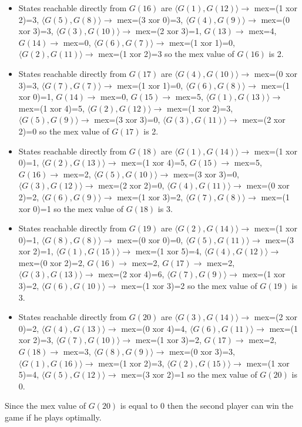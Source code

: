 \begin{solution}
\begin{itemize}
\item States reachable directly from $G(16)$ are $\langle G(1), G(12) \rangle \rightarrow$ mex=(1 xor 2)=3, $\langle G(5), G(8) \rangle \rightarrow$ mex=(3 xor 0)=3, $\langle G(4), G(9) \rangle \rightarrow$ mex=(0 xor 3)=3, $\langle G(3), G(10) \rangle \rightarrow$ mex=(2 xor 3)=1, $G(13) \rightarrow$ mex=4, $G(14) \rightarrow$ mex=0, $\langle G(6), G(7) \rangle \rightarrow$ mex=(1 xor 1)=0, $\langle G(2), G(11) \rangle \rightarrow$ mex=(1 xor 2)=3  so the mex value of $G(16)$ is 2.
\item States reachable directly from $G(17)$ are $\langle G(4), G(10) \rangle \rightarrow$ mex=(0 xor 3)=3, $\langle G(7), G(7) \rangle \rightarrow$ mex=(1 xor 1)=0, $\langle G(6), G(8) \rangle \rightarrow$ mex=(1 xor 0)=1, $G(14) \rightarrow$ mex=0, $G(15) \rightarrow$ mex=5, $\langle G(1), G(13) \rangle \rightarrow$ mex=(1 xor 4)=5, $\langle G(2), G(12) \rangle \rightarrow$ mex=(1 xor 2)=3, $\langle G(5), G(9) \rangle \rightarrow$ mex=(3 xor 3)=0, $\langle G(3), G(11) \rangle \rightarrow$ mex=(2 xor 2)=0  so the mex value of $G(17)$ is 2.
\item States reachable directly from $G(18)$ are $\langle G(1), G(14) \rangle \rightarrow$ mex=(1 xor 0)=1, $\langle G(2), G(13) \rangle \rightarrow$ mex=(1 xor 4)=5, $G(15) \rightarrow$ mex=5, $G(16) \rightarrow$ mex=2, $\langle G(5), G(10) \rangle \rightarrow$ mex=(3 xor 3)=0, $\langle G(3), G(12) \rangle \rightarrow$ mex=(2 xor 2)=0, $\langle G(4), G(11) \rangle \rightarrow$ mex=(0 xor 2)=2, $\langle G(6), G(9) \rangle \rightarrow$ mex=(1 xor 3)=2, $\langle G(7), G(8) \rangle \rightarrow$ mex=(1 xor 0)=1  so the mex value of $G(18)$ is 3.
\item States reachable directly from $G(19)$ are $\langle G(2), G(14) \rangle \rightarrow$ mex=(1 xor 0)=1, $\langle G(8), G(8) \rangle \rightarrow$ mex=(0 xor 0)=0, $\langle G(5), G(11) \rangle \rightarrow$ mex=(3 xor 2)=1, $\langle G(1), G(15) \rangle \rightarrow$ mex=(1 xor 5)=4, $\langle G(4), G(12) \rangle \rightarrow$ mex=(0 xor 2)=2, $G(16) \rightarrow$ mex=2, $G(17) \rightarrow$ mex=2, $\langle G(3), G(13) \rangle \rightarrow$ mex=(2 xor 4)=6, $\langle G(7), G(9) \rangle \rightarrow$ mex=(1 xor 3)=2, $\langle G(6), G(10) \rangle \rightarrow$ mex=(1 xor 3)=2  so the mex value of $G(19)$ is 3.
\item States reachable directly from $G(20)$ are $\langle G(3), G(14) \rangle \rightarrow$ mex=(2 xor 0)=2, $\langle G(4), G(13) \rangle \rightarrow$ mex=(0 xor 4)=4, $\langle G(6), G(11) \rangle \rightarrow$ mex=(1 xor 2)=3, $\langle G(7), G(10) \rangle \rightarrow$ mex=(1 xor 3)=2, $G(17) \rightarrow$ mex=2, $G(18) \rightarrow$ mex=3, $\langle G(8), G(9) \rangle \rightarrow$ mex=(0 xor 3)=3, $\langle G(1), G(16) \rangle \rightarrow$ mex=(1 xor 2)=3, $\langle G(2), G(15) \rangle \rightarrow$ mex=(1 xor 5)=4, $\langle G(5), G(12) \rangle \rightarrow$ mex=(3 xor 2)=1  so the mex value of $G(20)$ is 0.
\end{itemize}

Since the mex value of $G(20)$ is equal to 0 then the second player can win the game if he plays optimally.
\end{solution}
